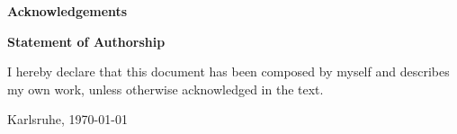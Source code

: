 \thispagestyle{plain}

\centerline{\textbf{Acknowledgements}}
\vspace{0.25cm}

\lipsum

\vspace*{\fill}



\centerline{\textbf{Statement of Authorship}}
\vspace{0.25cm}

I hereby declare that this document has been composed by myself and describes my own work, unless otherwise acknowledged in the text.

\vspace{2.5cm}

\noindent
\makebox[7.5cm]{\hrulefill}

\hspace{0.25cm}
Karlsruhe, \today

\vspace{2cm}
